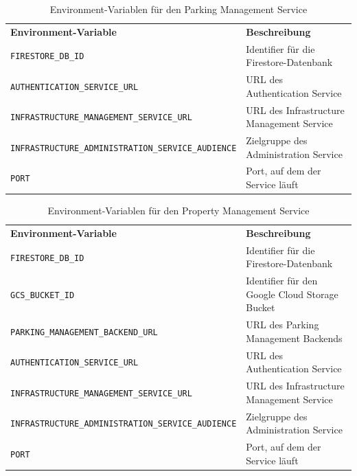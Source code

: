 {
\begin{longtable}{l p{6cm}}
  \caption{Environment-Variablen für den Parking Management Service}
  \label{tab:parking-mgmt-service-env-vars} \\
  \textbf{Environment-Variable} & \textbf{Beschreibung} \\ [1ex]
  \texttt{FIRESTORE\_DB\_ID} & Identifier für die Firestore-Datenbank \\ [0.5ex]
  \texttt{AUTHENTICATION\_SERVICE\_URL} & URL des Authentication Service \\ [0.5ex]
  \texttt{INFRASTRUCTURE\_MANAGEMENT\_SERVICE\_URL} & URL des Infrastructure Management Service \\ [0.5ex]
  \texttt{INFRASTRUCTURE\_ADMINISTRATION\_SERVICE\_AUDIENCE} & Zielgruppe des Administration Service \\ [0.5ex]
  \texttt{PORT} & Port, auf dem der Service läuft \\ 
\end{longtable}}

{
\begin{longtable}{l p{6cm}}
  \caption{Environment-Variablen für den Property Management Service}
  \label{tab:property-mgmt-service-env-vars} \\
  \textbf{Environment-Variable} & \textbf{Beschreibung} \\ [1ex]
  \texttt{FIRESTORE\_DB\_ID} & Identifier für die Firestore-Datenbank \\ [0.5ex]
  \texttt{GCS\_BUCKET\_ID} & Identifier für den Google Cloud Storage Bucket \\ [0.5ex]
  \texttt{PARKING\_MANAGEMENT\_BACKEND\_URL} & URL des Parking Management Backends \\ [0.5ex]
  \texttt{AUTHENTICATION\_SERVICE\_URL} & URL des Authentication Service \\ [0.5ex]
  \texttt{INFRASTRUCTURE\_MANAGEMENT\_SERVICE\_URL} & URL des Infrastructure Management Service \\ [0.5ex]
  \texttt{INFRASTRUCTURE\_ADMINISTRATION\_SERVICE\_AUDIENCE} & Zielgruppe des Administration Service \\ [0.5ex]
  \texttt{PORT} & Port, auf dem der Service läuft \\ 
\end{longtable}}

